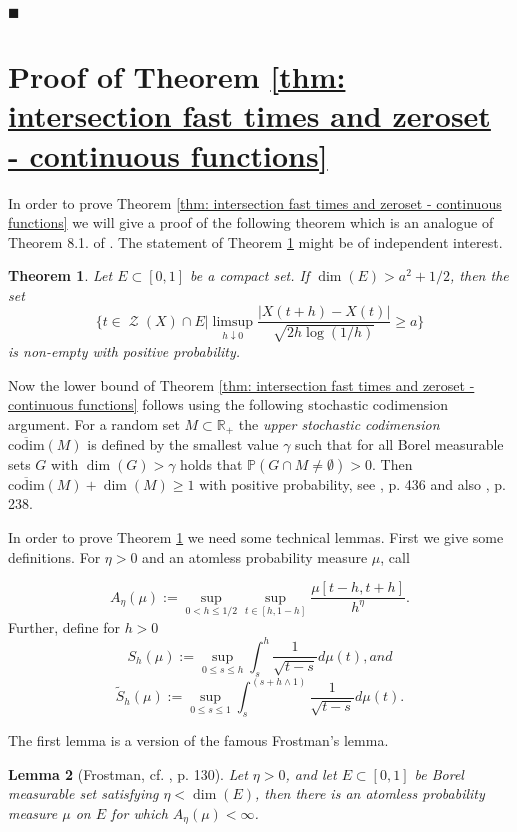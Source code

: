 \documentclass[11pt, reqno]{amsart}
\theoremstyle{plain}
\newtheorem{theorem}{Theorem}[section]
\newtheorem{lemma}[theorem]{Lemma}
\theoremstyle{definition}
\theoremstyle{remark}
\begin{document}
\begin{flushright} $\blacksquare$ \end{flushright}

\section{Proof of Theorem \ref{thm: intersection fast times and zeroset - continuous functions} } \label{Lower bound - intersection result}

 In order to prove Theorem \ref{thm: intersection fast times and zeroset - continuous functions} we will give a proof of the following theorem which is an analogue of Theorem 8.1. of \cite{KS}. The statement of Theorem \ref{thm: compact set intersection} might be of independent interest.

 \begin{theorem}\label{thm: compact set intersection}
 Let $E \subset [0,1]$ be a compact set. If
 $\dim(E)> a^2 + 1/2$, then the set
 \[
 \Big\{ t\in\operatorname{\mathcal{Z}}(X)\cap E  \Big| \limsup_{h \downarrow 0} \frac{|X(t+h)-X(t)|}{\sqrt{2h\log{(1/h)}}} \geq a  \Big\}
 \]
  is non-empty with positive probability.
 \end{theorem}
Now the lower bound of Theorem \ref{thm: intersection fast times and zeroset - continuous functions} follows using the following stochastic codimension argument.
For a random set $M\subset {\mathbb{R}}_+$ the \emph{upper stochastic codimension} $\overline{\mathrm{codim}}(M)$ is defined by the smallest value $\gamma$ such that for all Borel measurable sets $G$ with $\dim(G)>\gamma$ holds that ${\mathbb{P}}(G\cap M \neq \emptyset)>0$.
Then $\overline{\mathrm{codim}}(M) + \dim(M) \geq 1$ with positive probability, see \cite{Kho02}, p. 436 and also \cite{Kho03}, p. 238. 

In order to prove Theorem \ref{thm: compact set intersection} we need some technical lemmas. First we give some definitions.
For $\eta >0$ and an atomless probability measure $\mu$, call

\[ A_{\eta}(\mu):= \sup_{0<h\leq 1/2}\sup_{t\in[h,1-h]}\frac{\mu[t-h,t+h]}{h^\eta}.
\]
Further, define for $h>0$
$$ S_h(\mu) := \sup_{0\leq s\leq h} \int_s ^h \frac{1}{\sqrt{t-s}} d\mu(t), and $$
$$ \tilde{S}_h(\mu) := \sup_{0\leq s\leq 1} \int_s ^{(s+h\wedge 1)} \frac{1}{\sqrt{t-s}} d\mu(t). $$

The first lemma is a version of the famous Frostman's lemma.

\begin{lemma}[Frostman, cf. \cite{Kahane}, p. 130]\label{lm: Frostman}
Let $\eta >0$, and let $E \subset [0,1]$ be Borel measurable set satisfying $\eta < \dim(E)$,
then there is an atomless probability measure $\mu$ on $E$ for which
$ A_{\eta}(\mu) < \infty$.
\end{lemma}
\end{document}
